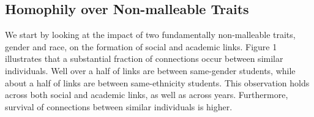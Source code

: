 \documentclass[12pt,letterpaper,english]{article}
\begin{document}

%



\subsection{Homophily over Non-malleable Traits}
\label{sec:homophilyNonmalleable}

We start by looking at the impact of two fundamentally non-malleable traits, gender and race, on the formation of social and academic links. Figure 1 illustrates that a substantial fraction of connections occur between similar individuals. Well over a half of links are between same-gender students, while about a half of links are between same-ethnicity students. This observation holds across both social and academic links, as well as across years. Furthermore, survival of connections between similar individuals is higher.





\end{document}
